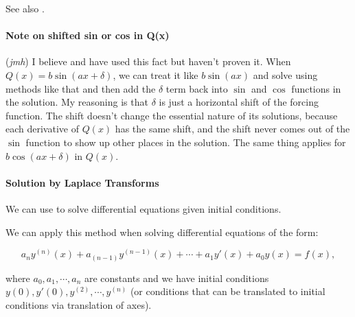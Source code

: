 \documentclass{article}
\begin{document}
See also .

\paragraph{Note on shifted sin or cos in Q(x)}

(\emph{jmh}) I believe and have used this fact but haven't proven it. When $Q(x) = b\sin{(ax+\delta)}$, we can treat it like $b\sin{(ax)}$ and solve using methods like that and then add the $\delta$ term back into $\sin$ and $\cos$ functions in the solution. My reasoning is that $\delta$ is just a horizontal shift of the forcing function. The shift doesn't change the essential nature of its solutions, because each derivative of $Q(x)$ has the same shift, and the shift never comes out of the $\sin$ function to show up other places in the solution. The same thing applies for $b\cos{(ax+\delta)}$ in $Q(x)$.

\paragraph{Solution by Laplace Transforms}

We can use  to solve differential equations given initial conditions.

We can apply this method when solving differential equations of the form:

\[ a_ny^{(n)}(x) + a_{(n-1)}y^{(n-1)}(x) + \cdots + a_1y'(x) + a_0y(x) = f(x), \]

where $a_0, a_1, \cdots, a_n$ are constants and we have initial conditions $y(0), y'(0), y^{(2)}, \cdots, y^{(n)}$  (or conditions that can be translated to initial conditions via translation of axes).
\end{document}
